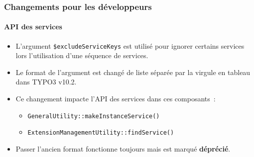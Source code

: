 \begin{frame}[fragile]
	\frametitle{Changements pour les développeurs}
	\framesubtitle{API des services}

	\begin{itemize}
		\item L'argument \texttt{\$excludeServiceKeys} est utilisé pour ignorer certains services lors l'utilisation
			d'une séquence de services.
		\item Le format de l'argument est changé de liste séparée par la virgule en tableau dans TYPO3 v10.2.
		\item Ce changement impacte l'API des services dans ces composants~:

			\begin{itemize}
				\item \texttt{GeneralUtility::makeInstanceService()}
				\item \texttt{ExtensionManagementUtility::findService()}
			\end{itemize}

		\item Passer l'ancien format fonctionne toujours mais est marqué \textbf{déprécié}.

	\end{itemize}

\end{frame}

